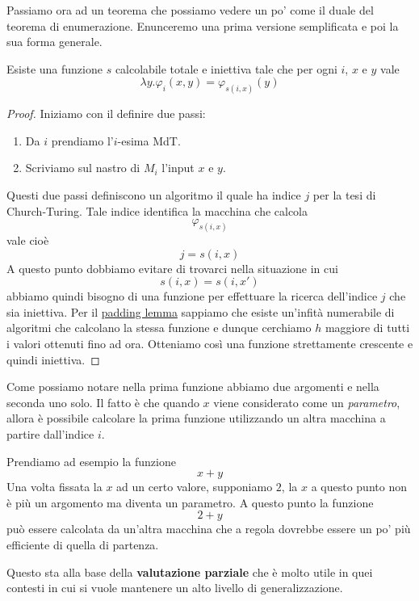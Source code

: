 Passiamo ora ad un teorema che possiamo vedere un po' come il
duale del teorema di enumerazione. Enunceremo una prima versione
semplificata e poi la sua forma generale.

\begin{theorem}
	\label{th: s-1-1}
	Esiste una funzione $s$ calcolabile totale e iniettiva tale
	che per ogni $i$, $x$ e $y$ vale
	\[ \lambda y . \varphi_i (x, y) = \varphi_{s (i, x)} (y) \]
	\begin{proof}
		Iniziamo con il definire due passi:
		\begin{enumerate}
			\item Da $i$ prendiamo l'$i$-esima MdT.
			\item Scriviamo sul nastro di $M_i$ l'input $x$ e
			      $y$.
		\end{enumerate}
		Questi due passi definiscono un algoritmo il quale ha
		indice $j$ per la tesi di Church-Turing. Tale indice
		identifica la macchina che calcola
		\[ \varphi_{s(i,x)} \]
		vale cioè
		\[ j = s(i, x) \]
		A questo punto dobbiamo evitare di trovarci nella
		situazione in cui
		\[ s(i, x) = s(i, x') \]
		abbiamo quindi bisogno di una funzione per effettuare la
		ricerca dell'indice $j$ che sia iniettiva. Per il
		\hyperref[th: padding lemma]{padding lemma} sappiamo che
		esiste un'infità numerabile di algoritmi che calcolano
		la stessa funzione e dunque cerchiamo $h$ maggiore di
		tutti i valori ottenuti fino ad ora. Otteniamo così una
		funzione strettamente crescente e quindi iniettiva.
	\end{proof}
\end{theorem}

Come possiamo notare nella prima funzione abbiamo due argomenti
e nella seconda uno solo. Il fatto è che quando $x$ viene
considerato come un \emph{parametro}, allora è possibile
calcolare la prima funzione utilizzando un altra macchina a
partire dall'indice $i$.

\begin{example}
	Prendiamo ad esempio la funzione
	\[ x + y \]
	Una volta fissata la $x$ ad un certo valore, supponiamo
	$2$, la $x$ a questo punto non è più un argomento ma
	diventa un parametro. A questo punto la funzione
	\[ 2 + y \]
	può essere calcolata da un'altra macchina che a regola
	dovrebbe essere un po' più efficiente di quella di partenza.
\end{example}

Questo sta alla base della \textbf{valutazione parziale} che è
molto utile in quei contesti in cui si vuole mantenere un alto
livello di generalizzazione.

